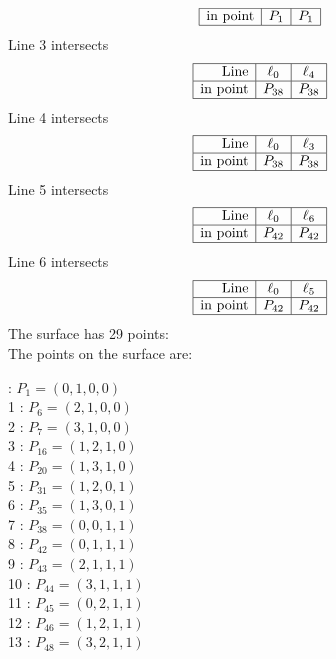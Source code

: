 \documentclass{article}
\begin{document}
{$$\begin{array}{|r*{2}{|c}|}
\hline
\mbox{in point}  & P_{1} & P_{1}\\
\hline
\end{array}
$$
Line 3 intersects 
$$
\begin{array}{|r*{2}{|c}|}
\hline
\mbox{Line}  & \ell_{0} & \ell_{4}\\
\hline
\mbox{in point}  & P_{38} & P_{38}\\
\hline
\end{array}
$$
Line 4 intersects 
$$
\begin{array}{|r*{2}{|c}|}
\hline
\mbox{Line}  & \ell_{0} & \ell_{3}\\
\hline
\mbox{in point}  & P_{38} & P_{38}\\
\hline
\end{array}
$$
Line 5 intersects 
$$
\begin{array}{|r*{2}{|c}|}
\hline
\mbox{Line}  & \ell_{0} & \ell_{6}\\
\hline
\mbox{in point}  & P_{42} & P_{42}\\
\hline
\end{array}
$$
Line 6 intersects 
$$
\begin{array}{|r*{2}{|c}|}
\hline
\mbox{Line}  & \ell_{0} & \ell_{5}\\
\hline
\mbox{in point}  & P_{42} & P_{42}\\
\hline
\end{array}
$$
The surface has 29 points:\\
The points on the surface are:\\
\begin{multicols}{3}
 : $P_{1}=( 0, 1, 0, 0 )$\\
1 : $P_{6}=( 2, 1, 0, 0 )$\\
2 : $P_{7}=( 3, 1, 0, 0 )$\\
3 : $P_{16}=( 1, 2, 1, 0 )$\\
4 : $P_{20}=( 1, 3, 1, 0 )$\\
5 : $P_{31}=( 1, 2, 0, 1 )$\\
6 : $P_{35}=( 1, 3, 0, 1 )$\\
7 : $P_{38}=( 0, 0, 1, 1 )$\\
8 : $P_{42}=( 0, 1, 1, 1 )$\\
9 : $P_{43}=( 2, 1, 1, 1 )$\\
10 : $P_{44}=( 3, 1, 1, 1 )$\\
11 : $P_{45}=( 0, 2, 1, 1 )$\\
12 : $P_{46}=( 1, 2, 1, 1 )$\\
13 : $P_{48}=( 3, 2, 1, 1 )$\\

\end{multicols}}
\end{document}
